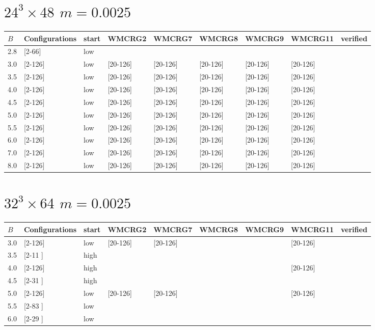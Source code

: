 \documentclass{article}
\begin{document}
  \section*{$24^3\times48$  $m=0.0025$}
    \begin{tabular}{| l | l | l | l | l | l | l | l | l |}
      \hline
      $B$ & Configurations & start & WMCRG2 & WMCRG7 & WMCRG8 & WMCRG9 & WMCRG11 & verified\\
      \hline
      2.8 & [2-66]  & low &  &  &  &  &  &\\
      3.0 & [2-126] & low & [20-126] & [20-126] & [20-126] & [20-126] & [20-126] &\\
      3.5 & [2-126] & low & [20-126] & [20-126] & [20-126] & [20-126] & [20-126] &\\
      4.0 & [2-126] & low & [20-126] & [20-126] & [20-126] & [20-126] & [20-126] &\\
      4.5 & [2-126] & low & [20-126] & [20-126] & [20-126] & [20-126] & [20-126] &\\
      5.0 & [2-126] & low & [20-126] & [20-126] & [20-126] & [20-126] & [20-126] &\\
      5.5 & [2-126] & low & [20-126] & [20-126] & [20-126] & [20-126] & [20-126] &\\
      6.0 & [2-126] & low & [20-126] & [20-126] & [20-126] & [20-126] & [20-126] &\\
      7.0 & [2-126] & low & [20-126] & [20-126] & [20-126] & [20-126] & [20-126] &\\
      8.0 & [2-126] & low & [20-126] & [20-126] & [20-126] & [20-126] & [20-126] &\\
      \hline
    \end{tabular}
  \section*{$32^3\times64$  $m=0.0025$}
    \begin{tabular}{| l | l | l | l | l | l | l | l | l |}
      \hline
      $B$ & Configurations & start & WMCRG2 & WMCRG7 & WMCRG8 & WMCRG9 & WMCRG11 & verified\\
      \hline
      3.0 & [2-126] & low  & [20-126] & [20-126] &  &  & [20-126] &\\
      3.5 & [2-11 ] & high &  &  &  &  &  &\\
      4.0 & [2-126] & high &  &  &  &  & [20-126] &\\
      4.5 & [2-31 ] & high &  &  &  &  &  &\\
      5.0 & [2-126] & low  & [20-126] & [20-126] &  &  & [20-126] &\\
      5.5 & [2-83 ] & low  &  &  &  &  &  &\\
      6.0 & [2-29 ] & low  &  &  &  &  &  &\\
      \hline
    \end{tabular}
\end{document}
